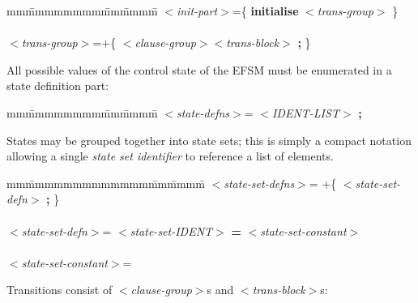 \begin{tabbing}
mm\=mmmmmmmm\=mm\=mmmm\=\+\kill
$<${\em init-part}$>$\>=\>\{ {\bf initialise} $<${\em trans-group}$>$ \}\\
\mbox{}\\
$<${\em trans-group}$>$\>=\>+\{ $<${\em clause-group}$><${\em trans-block}$>$
{\bf ;} \}\\
\end{tabbing}

All possible values of the control state of the EFSM must
be enumerated in a state definition part:

\begin{tabbing}
mm\=mmmmmmmm\=mm\=mmmm\=\+\kill
$<${\em state-defns}$>$\>= $<${\em IDENT-LIST}$>$ {\bf ;}
\end{tabbing}

States may be grouped together into state sets; this is
simply a compact notation allowing a single {\em state set
identifier} to reference a list of elements.

\begin{tabbing}
mm\=mmmmmmmmmmmmm\=mm\=mmmm\=\+\kill
$<${\em state-set-defns}$>$\>= +\{ $<${\em state-set-defn}$>$ {\bf ;}
\}\\
\mbox{}\\
$<${\em state-set-defn}$>$\>=\>
$<${\em state-set-IDENT}$>$ {\bf =} $<${\em state-set-constant}$>$\\
\mbox{}\\
$<${\em state-set-constant}$>$\>=\\
\end{tabbing}

Transitions consist of $<${\em clause-group}$>$s and 
$<${\em trans-block}$>$s:

